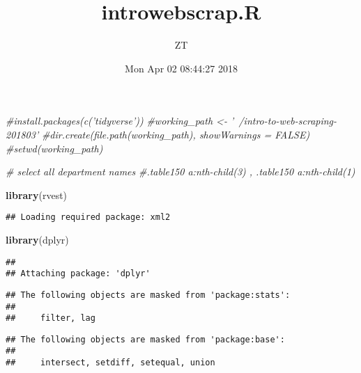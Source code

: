 \documentclass[]{article}
\title{introwebscrap.R}
\author{ZT}
\date{Mon Apr 02 08:44:27 2018}
\newenvironment{Shaded}{\begin{snugshade}}{\end{snugshade}}
\newcommand{\KeywordTok}[1]{\textcolor[rgb]{0.13,0.29,0.53}{\textbf{#1}}}
\newcommand{\CommentTok}[1]{\textcolor[rgb]{0.56,0.35,0.01}{\textit{#1}}}
\newcommand{\NormalTok}[1]{#1}
\begin{document}
\maketitle

\begin{Shaded}
\begin{Highlighting}[]
\CommentTok{#install.packages(c('tidyverse'))}
\CommentTok{#working_path <- '~/intro-to-web-scraping-201803'}
\CommentTok{#dir.create(file.path(working_path), showWarnings = FALSE)}
\CommentTok{#setwd(working_path)}

\CommentTok{# select all department names}
\CommentTok{#.table150 a:nth-child(3) , .table150 a:nth-child(1)}

\KeywordTok{library}\NormalTok{(rvest)}
\end{Highlighting}
\end{Shaded}

\begin{verbatim}
## Loading required package: xml2
\end{verbatim}

\begin{Shaded}
\begin{Highlighting}[]
\KeywordTok{library}\NormalTok{(dplyr)}
\end{Highlighting}
\end{Shaded}

\begin{verbatim}
## 
## Attaching package: 'dplyr'
\end{verbatim}

\begin{verbatim}
## The following objects are masked from 'package:stats':
## 
##     filter, lag
\end{verbatim}

\begin{verbatim}
## The following objects are masked from 'package:base':
## 
##     intersect, setdiff, setequal, union
\end{verbatim}
\end{document}

